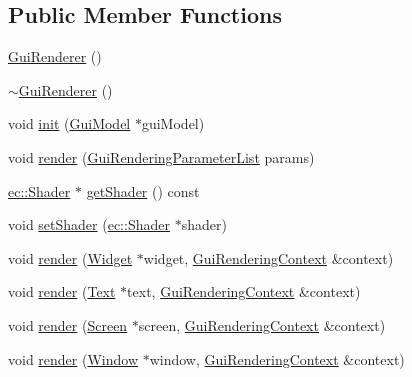 \subsection*{Public Member Functions}
\begin{DoxyCompactItemize}
\item 
\mbox{\hyperlink{classec__gui_1_1_gui_renderer_a3f1bd94abc7858301310670c8e74699c}{Gui\+Renderer}} ()
\item 
\mbox{\hyperlink{classec__gui_1_1_gui_renderer_ae2f5dd8870812ba957760f30d1c1ee3a}{$\sim$\+Gui\+Renderer}} ()
\item 
void \mbox{\hyperlink{classec__gui_1_1_gui_renderer_a35e7de4510fa8206976d894868710a99}{init}} (\mbox{\hyperlink{classec__gui_1_1_gui_model}{Gui\+Model}} $\ast$gui\+Model)
\item 
void \mbox{\hyperlink{classec__gui_1_1_gui_renderer_adf27a8072779fd7ce56315dd4db5ffd5}{render}} (\mbox{\hyperlink{structec__gui_1_1_gui_rendering_parameter_list}{Gui\+Rendering\+Parameter\+List}} params)
\item 
\mbox{\hyperlink{classec_1_1_shader}{ec\+::\+Shader}} $\ast$ \mbox{\hyperlink{classec__gui_1_1_gui_renderer_aa27617a3c91e94215388151e4262dec6}{get\+Shader}} () const
\item 
void \mbox{\hyperlink{classec__gui_1_1_gui_renderer_a01fd73fc0e9ff5eb801412b8f83dad9b}{set\+Shader}} (\mbox{\hyperlink{classec_1_1_shader}{ec\+::\+Shader}} $\ast$shader)
\item 
void \mbox{\hyperlink{classec__gui_1_1_gui_renderer_ac0242de734dc7f984221d3255eaf0f34}{render}} (\mbox{\hyperlink{classec__gui_1_1_widget}{Widget}} $\ast$widget, \mbox{\hyperlink{classec__gui_1_1_gui_rendering_context}{Gui\+Rendering\+Context}} \&context)
\item 
void \mbox{\hyperlink{classec__gui_1_1_gui_renderer_a3484329593908c38ce2953e9632ebce7}{render}} (\mbox{\hyperlink{classec__gui_1_1_text}{Text}} $\ast$text, \mbox{\hyperlink{classec__gui_1_1_gui_rendering_context}{Gui\+Rendering\+Context}} \&context)
\item 
void \mbox{\hyperlink{classec__gui_1_1_gui_renderer_ad33e6cb6537a95bcf9c2f2a575913e4d}{render}} (\mbox{\hyperlink{classec__gui_1_1_screen}{Screen}} $\ast$screen, \mbox{\hyperlink{classec__gui_1_1_gui_rendering_context}{Gui\+Rendering\+Context}} \&context)
\item 
void \mbox{\hyperlink{classec__gui_1_1_gui_renderer_a6f40e38fdaa3c580322009dcf4ae84ed}{render}} (\mbox{\hyperlink{classec__gui_1_1_window}{Window}} $\ast$window, \mbox{\hyperlink{classec__gui_1_1_gui_rendering_context}{Gui\+Rendering\+Context}} \&context)
\end{DoxyCompactItemize}



